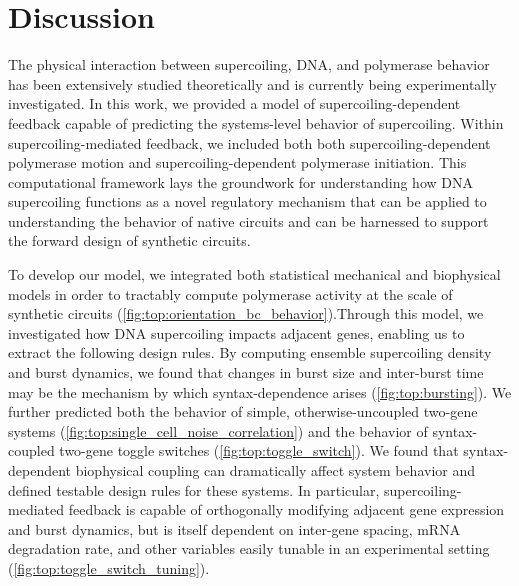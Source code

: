 \documentclass[11pt]{article}
\begin{document}
\FloatBarrier
\section{Discussion}
The physical interaction between supercoiling, DNA, and polymerase behavior has been extensively studied theoretically and is currently being experimentally investigated.
In this work, we provided a model of supercoiling-dependent feedback capable of predicting the systems-level behavior of supercoiling. Within supercoiling-mediated feedback, we included both both supercoiling-dependent polymerase motion and supercoiling-dependent polymerase initiation. This computational framework lays the groundwork for understanding how DNA supercoiling functions as a novel regulatory mechanism that can be applied to understanding the behavior of native circuits and can be harnessed to support the forward design of synthetic circuits. %

To develop our model, we integrated both statistical mechanical and biophysical models in order to tractably compute polymerase activity at the scale of synthetic circuits  (\cref{fig:top:orientation_bc_behavior}).Through this model, we investigated how DNA supercoiling impacts adjacent genes, enabling us to extract the following design rules. %
By computing ensemble supercoiling density and burst dynamics, we found that changes in burst size and inter-burst time may be the mechanism by which syntax-dependence arises (\cref{fig:top:bursting}). We further predicted both the behavior of simple, otherwise-uncoupled two-gene systems (\cref{fig:top:single_cell_noise_correlation}) and the behavior of syntax-coupled two-gene toggle switches (\cref{fig:top:toggle_switch}). We found that syntax-dependent biophysical coupling can dramatically affect system behavior and defined testable design rules for these systems. In particular, supercoiling-mediated feedback is capable of orthogonally modifying adjacent gene expression and burst dynamics, but is itself dependent on inter-gene spacing, mRNA degradation rate, and other variables easily tunable in an experimental setting (\cref{fig:top:toggle_switch_tuning}).
\end{document}
